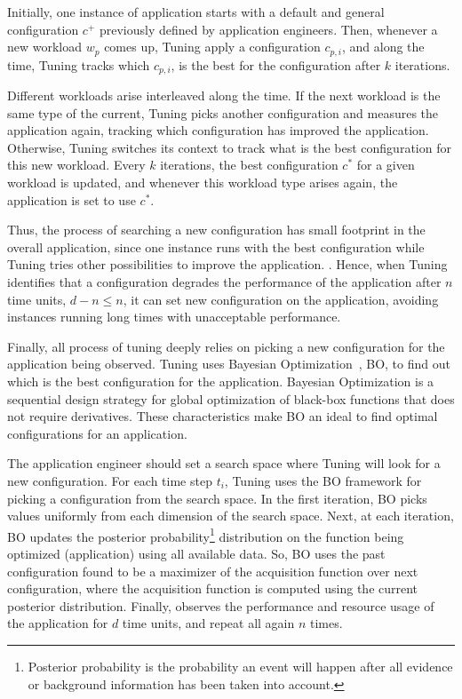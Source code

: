 Initially, one instance of application starts with a default and general
configuration $c^+$ previously defined by application engineers. Then, whenever
a new workload $w_p$ comes up, Tuning apply a configuration $c_{p,i}$, and along
the time, Tuning tracks which $c_{p,i}$, is the best for the configuration after
$k$ iterations.

Different workloads arise interleaved along the time. If the next workload is
the same type of the current, Tuning picks another configuration and measures
the application again, tracking which configuration has improved the
application. Otherwise, Tuning switches its context to track what is the best
configuration for this new workload. Every $k$ iterations, the best
configuration $c^*$ for a given workload is updated, and whenever this workload
type arises again, the application is set to use $c^*$.

Thus, the process of searching a new configuration has small footprint in the
overall application, since one instance runs with the best configuration while
Tuning tries other possibilities to improve the application. . Hence,
when Tuning identifies that a configuration degrades the performance of the
application after $n$ time units, $d - n \le n$, it can set new configuration on
the application, avoiding instances running long times with unacceptable
performance.

Finally, all process of tuning deeply relies on picking a new configuration for
the application being observed. Tuning uses Bayesian Optimization~\cite{?}, BO,
to find out which is the best configuration for the application. Bayesian
Optimization is a sequential design strategy for global optimization of
black-box functions that does not require derivatives. These characteristics
make BO an ideal to find optimal configurations for an application.



The application engineer should set a search space where Tuning will look for a
new configuration. For each time step $t_i$, Tuning uses the BO framework for
picking a configuration from the search space. In the first iteration, BO picks
values uniformly from each dimension of the search space. Next, at each
iteration, BO updates the posterior probability\footnote{Posterior probability is
the probability an event will happen after all evidence or background
information has been taken into account.} distribution on the function being
optimized (application) using all available data. So, BO uses the past
configuration found to be a maximizer of the acquisition function over next
configuration, where the acquisition function is computed using the current
posterior distribution. Finally, observes the performance and resource usage of
the application for $d$ time units, and repeat all again $n$ times.

